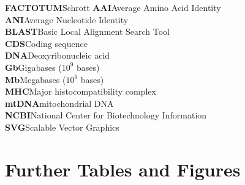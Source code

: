 \documentclass[twoside,12pt,a4paper]{report}
\begin{document}
\begin{tabbing}
\textbf{FACTOTUM}\hspace{1cm}\=Schrott\kill
\textbf{AAI}\>Average Amino Acid Identity \\
\textbf{ANI}\>Average Nucleotide Identity \\
\textbf{BLAST}\>Basic Local Alignment Search Tool \\
\textbf{CDS}\>Coding sequence\\
\textbf{DNA}\>Deoxyribonucleic acid \\
\textbf{Gb}\>Gigabases ($10^9$ bases) \\
\textbf{Mb}\>Megabases ($10^6$ bases) \\
\textbf{MHC}\>Major histocompatibility complex \\
\textbf{mtDNA}\>mitochondrial DNA \\
\textbf{NCBI}\>National Center for Biotechnology Information \\
\textbf{SVG}\>Scalable Vector Graphics\\
\end{tabbing}

\cleardoublepage


\setcounter{page}{1}


\cleardoublepage


\cleardoublepage


\cleardoublepage


\cleardoublepage


\cleardoublepage


\appendix
\chapter{Further Tables and Figures} \label{chap:App}

\cleardoublepage
\end{document}
